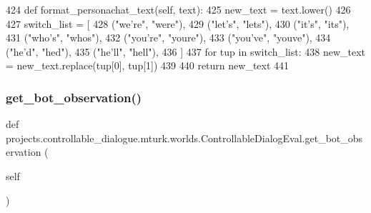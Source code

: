 \begin{DoxyCode}
424     \textcolor{keyword}{def }format\_personachat\_text(self, text):
425         new\_text = text.lower()
426 
427         switch\_list = [
428             (\textcolor{stringliteral}{"we're"}, \textcolor{stringliteral}{"were"}),
429             (\textcolor{stringliteral}{"let's"}, \textcolor{stringliteral}{"lets"}),
430             (\textcolor{stringliteral}{"it's"}, \textcolor{stringliteral}{"its"}),
431             (\textcolor{stringliteral}{"who's"}, \textcolor{stringliteral}{"whos"}),
432             (\textcolor{stringliteral}{"you're"}, \textcolor{stringliteral}{"youre"}),
433             (\textcolor{stringliteral}{"you've"}, \textcolor{stringliteral}{"youve"}),
434             (\textcolor{stringliteral}{"he'd"}, \textcolor{stringliteral}{"hed"}),
435             (\textcolor{stringliteral}{"he'll"}, \textcolor{stringliteral}{"hell"}),
436         ]
437         \textcolor{keywordflow}{for} tup \textcolor{keywordflow}{in} switch\_list:
438             new\_text = new\_text.replace(tup[0], tup[1])
439 
440         \textcolor{keywordflow}{return} new\_text
441 
\end{DoxyCode}
\mbox{\label{classprojects_1_1controllable__dialogue_1_1mturk_1_1worlds_1_1ControllableDialogEval_aa5b2e18bf75fe4ae814672951ecc6e1d}} 
\subsubsection{\texorpdfstring{get\+\_\+bot\+\_\+observation()}{get\_bot\_observation()}}
{\footnotesize\ttfamily def projects.\+controllable\+\_\+dialogue.\+mturk.\+worlds.\+Controllable\+Dialog\+Eval.\+get\+\_\+bot\+\_\+observation (\begin{DoxyParamCaption}\item[{}]{self }\end{DoxyParamCaption})}



